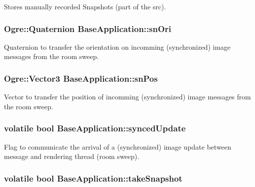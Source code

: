 \-Stores manually recorded \-Snapshots (part of the src). \hypertarget{classBaseApplication_a60cc66a44a0900ec65d19b3903168ca5}{
\subsubsection[{sn\-Ori}]{\setlength{\rightskip}{0pt plus 5cm}\-Ogre\-::\-Quaternion {\bf \-Base\-Application\-::sn\-Ori}}}\label{classBaseApplication_a60cc66a44a0900ec65d19b3903168ca5}
\-Quaternion to transfer the orientation on incomming (synchronized) image messages from the room sweep. \hypertarget{classBaseApplication_a7762b8555eb6aabd8687b34fafae2405}{
\subsubsection[{sn\-Pos}]{\setlength{\rightskip}{0pt plus 5cm}\-Ogre\-::\-Vector3 {\bf \-Base\-Application\-::sn\-Pos}}}\label{classBaseApplication_a7762b8555eb6aabd8687b34fafae2405}
\-Vector to transfer the position of incomming (synchronized) image messages from the room sweep. \hypertarget{classBaseApplication_a921d190dc1981ae57a49972c3b7ffbc9}{
\subsubsection[{synced\-Update}]{\setlength{\rightskip}{0pt plus 5cm}volatile bool {\bf \-Base\-Application\-::synced\-Update}}}\label{classBaseApplication_a921d190dc1981ae57a49972c3b7ffbc9}
\-Flag to communicate the arrival of a (synchronized) image update between message and rendering thread (room sweep). \hypertarget{classBaseApplication_af7b2240ae783b353704370debc7092ba}{
\subsubsection[{take\-Snapshot}]{\setlength{\rightskip}{0pt plus 5cm}volatile bool {\bf \-Base\-Application\-::take\-Snapshot}}}\label{classBaseApplication_af7b2240ae783b353704370debc7092ba}
